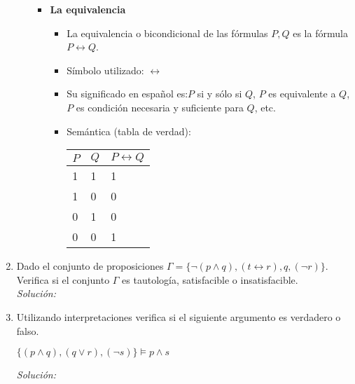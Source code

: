 \documentclass[letterpaper,11pt]{article}
\begin{document}
\begin{enumerate}
\begin{itemize}
\begin{itemize}
                \newpage
                \item \textbf{La equivalencia}
                \begin{itemize}
                    \item La equivalencia o bicondicional de las fórmulas 
                    $P, Q$ es la fórmula $P \leftrightarrow Q$.
                    \item Símbolo utilizado: $\leftrightarrow$
                    \item Su significado en español es:$P$ si y sólo si $Q$,
                    $P$ es equivalente a $Q$, $P$ es condición necesaria y
                    suficiente para $Q$, etc.
                    \item Semántica (tabla de verdad):
                    \begin{table}[htbp]
                        \begin{center}
                        \begin{tabular}{|l|l|l|}
                        \hline
                        $P$ & $Q$ & $P \leftrightarrow Q$ \\
                        \hline \hline 
                        1 & 1 & 1 \\ \hline
                        1 & 0 & 0 \\ \hline
                        0 & 1 & 0 \\ \hline
                        0 & 0 & 1 \\  \hline
                        \end{tabular}
                        \end{center}
                    \end{table}  

                \end{itemize}

            \end{itemize}
            
        \end{itemize}

        \item Dado el conjunto de proposiciones 
        $\Gamma = \{ \neg (p \land q), (t \leftrightarrow r), q, (\neg r) \}$.
        Verifica si el conjunto $\Gamma$ es tautología, satisfacible o
        insatisfacible. \\
        \textit{Solución:}

        \item Utilizando interpretaciones verifica si el siguiente argumento
        es verdadero o falso.
        \begin{center}
            $\{ (p \land q), (q \lor r), (\neg s) \} \models p \land s$
        \end{center}
        \textit{Solución:}


\end{enumerate}
\end{document}
